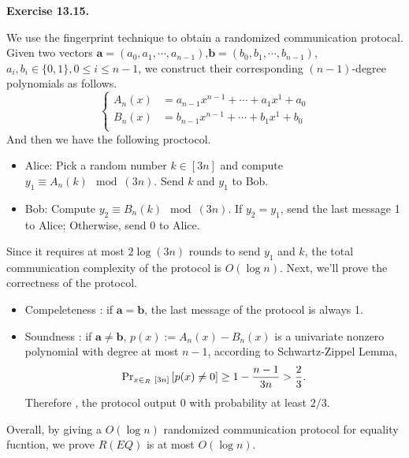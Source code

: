 \documentclass[a4paper]{article}
\newenvironment{exercise}[1]{
	\par
	\noindent\textbf{Exercise #1.}\quad
}{
	\par
	\bigskip
}
\begin{document}
    \begin{exercise}{13.15}
    	We use the fingerprint technique to obtain a randomized communication protocal. Given two vectors $\mathbf{a}=(a_0,a_1,\cdots,a_{n-1})$,$\mathbf{b}=(b_0,b_1,\cdots,b_{n-1})$, $ a_i,b_i \in \{0,1\}, 0\leq i \leq n-1 $, we construct their corresponding  $(n-1)$-degree polynomials as follows.
      \begin{equation*}
      	 \left\{
      	 	\begin{aligned}
      	 		A_n(x) &= a_{n-1} x^{n-1} + \cdots + a_1 x^1 + a_0 \\
      	 		B_n(x) &= b_{n-1} x^{n-1} + \cdots + b_1 x^1 + b_0 \\
      	 	\end{aligned}
      	 \right .
      \end{equation*}
      And then we have the following proctocol.
      \begin{itemize}
       \item Alice: Pick a random number $k \in \left[ 3n \right]$ and  compute $y_1\equiv A_n(k) \mod (3n) $. Send $k$ and $y_1$ to Bob.
       \item Bob: Compute $y_2 \equiv B_n(k) \mod (3n)$. If $y_2 = y_1$, send the last message 1 to Alice; Otherwise, send 0 to Alice. 
      \end{itemize}
      Since  it requires at most $2\log(3n)$ rounds to send $y_1$ and $k$,  the total communication complexity of the protocol is $O(\log n)$. Next, we'll prove the correctness of the protocol.
      \begin{itemize}
      		\item Compeleteness : if $\mathbf{a}= \mathbf{b}$, the last message of the protocol is always 1.
      		\item Soundness : if $\mathbf{a} \neq \mathbf{b}$, $p(x) := A_n(x) - B_n(x)$ is a univariate nonzero polynomial with degree at most $n-1$, according to Schwartz-Zippel Lemma,
      		\[
      			{\rm Pr}_{x\in_{R} ~[3n]}\left[p(x) \neq 0 \right] \geq 1- \frac{n-1}{3n} > \frac{2}{3} .
      		\]
            Therefore , the protocol output 0 with probability at least $2/3$. 
      \end{itemize} 
  Overall, by giving a $O(\log n)$ randomized communication protocol for equality fucntion, we prove $R(EQ)$ is at most $O(\log n)$.
    \end{exercise}
\end{document}
